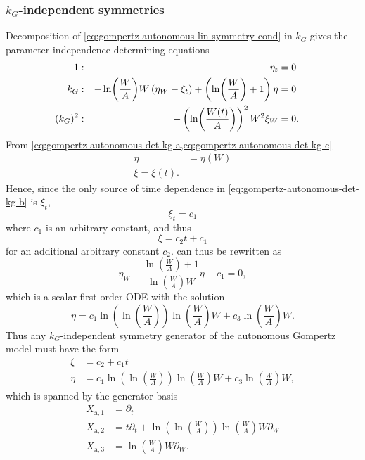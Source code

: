 \subsubsection{\texorpdfstring{\(k_G\)-independent symmetries}{Growth rate-independent symmetries}}

Decomposition of \cref{eq:gompertz-autonomous-lin-symmetry-cond} in \(k_G\) gives the parameter independence determining equations
\begin{subequations}
  \begin{flalign}
    1 & : & \eta_t &= 0 && \FlLabel{eq:gompertz-autonomous-det-kg-a}\\
    k_G & : & -\ln(\frac{W}{A}) W\left(\eta_W - \xi_t\right) + \left(\ln(\frac{W}{A}) + 1\right) \eta &= 0 && \FlLabel{eq:gompertz-autonomous-det-kg-b}\\
    (k_G)^2 & : & -\left(\ln(\frac{W(t)}{A})\right)^2 W^2 \xi_W &= 0. && \FlLabel{eq:gompertz-autonomous-det-kg-c}
  \end{flalign}
\end{subequations}
From \cref{eq:gompertz-autonomous-det-kg-a,eq:gompertz-autonomous-det-kg-c}
\begin{align}
  \eta &= \eta(W) \\
  \xi = \xi(t).
\end{align}
Hence, since the only source of time dependence in \cref{eq:gompertz-autonomous-det-kg-b} is \(\xi_t\),
\begin{equation}
  \xi_t = c_1
\end{equation}
where \(c_1\) is an arbitrary constant, and thus
\begin{equation}
  \xi = c_2 t + c_1
\end{equation}
for an additional arbitrary constant \(c_2\).
 can thus be rewritten as
\begin{equation}
  \eta_W - \frac{\ln(\frac{W}{A}) + 1}{\ln(\frac{W}{A}) W} \eta - c_1 = 0,
\end{equation}
which is a scalar first order ODE with the solution
\begin{equation}
  \eta = c_1 \ln(\ln(\frac{W}{A})) \ln(\frac{W}{A}) W + c_3 \ln(\frac{W}{A}) W.
\end{equation}
Thus any \(k_G\)-independent symmetry generator of the autonomous Gompertz model  must have the form
\begin{align}
  \xi &= c_2 + c_1 t \\
  \eta &= c_1 \ln(\ln(\frac{W}{A})) \ln(\frac{W}{A}) W + c_3 \ln(\frac{W}{A}) W,
\end{align}
which is spanned by the generator basis
\begin{align}
  X_{\text{a},1} &= \partial_t \\
  X_{\text{a},2} &= t \partial_t + \ln(\ln(\frac{W}{A})) \ln(\frac{W}{A}) W \partial_W\\
  X_{\text{a},3} &= \ln(\frac{W}{A}) W \partial_W.
\end{align}

